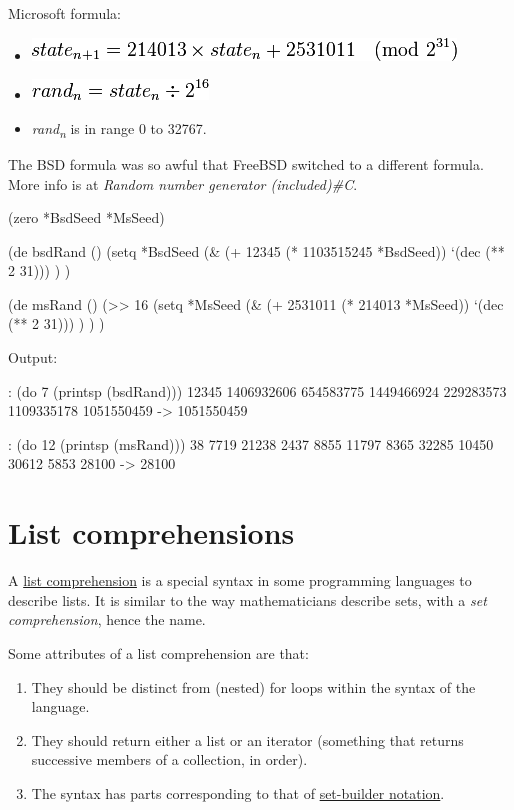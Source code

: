 \begin{itemize}
Microsoft formula:

\begin{itemize}
\item
  \includegraphics[scale=.6]{graphics/c9f11575eec8aadcac4687458ded5aa3.png}
\item
  \includegraphics[scale=.6]{graphics/a026db06e1a9bd6945c85c8e17231725.png}
\item
  \emph{r}\emph{a}\emph{n}\emph{d}\textsubscript{\emph{n}} is in range 0
  to 32767.
\end{itemize}

The BSD formula was so awful that FreeBSD switched to a different
formula. More info is at \emph{Random number generator (included)\#C}.

\begin{wideverbatim}

(zero *BsdSeed *MsSeed)

(de bsdRand ()
   (setq *BsdSeed
      (\& (+ 12345 (* 1103515245 *BsdSeed)) `(dec (** 2 31))) ) )

(de msRand ()
   (>> 16
      (setq *MsSeed
         (\& (+ 2531011 (* 214013 *MsSeed)) `(dec (** 2 31))) ) ) )

Output:

: (do 7 (printsp (bsdRand)))
12345 1406932606 654583775 1449466924 229283573 1109335178 1051550459 -> 1051550459

: (do 12 (printsp (msRand)))
38 7719 21238 2437 8855 11797 8365 32285 10450 30612 5853 28100 -> 28100

\end{wideverbatim}

\pagebreak{}
\section*{List comprehensions}

A \href{http://en.wikipedia.org/wiki/List\_comprehension}{list
comprehension} is a special syntax in some programming languages to
describe lists. It is similar to the way mathematicians describe sets,
with a \emph{set comprehension}, hence the name.

Some attributes of a list comprehension are that:

\begin{enumerate}
\item
  They should be distinct from (nested) for loops within the syntax of
  the language.
\item
  They should return either a list or an iterator (something that
  returns successive members of a collection, in order).
\item
  The syntax has parts corresponding to that of
  \href{http://en.wikipedia.org/wiki/Set-builder\_notation}{set-builder
  notation}.
\end{enumerate}


\end{itemize}
